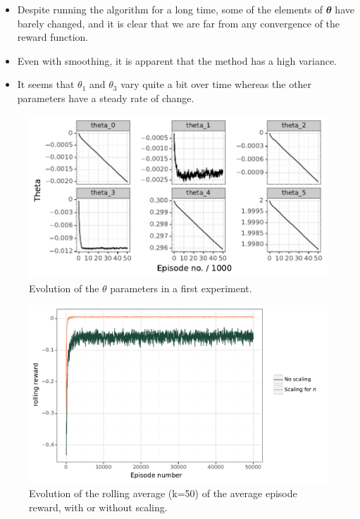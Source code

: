 \documentclass[
  letterpaper,
]{report}
\providecommand{\tightlist}{%
  \setlength{\itemsep}{0pt}\setlength{\parskip}{0pt}}\usepackage{longtable,booktabs,array}
\theoremstyle{plain}
\theoremstyle{definition}
\theoremstyle{definition}
\theoremstyle{remark}
\begin{document}
\begin{itemize}
\tightlist
\item
  Despite running the algorithm for a long time, some of the elements of
  \(\mathbfit{\theta}\) have barely changed, and it is clear that we are
  far from any convergence of the reward function.
\item
  Even with smoothing, it is apparent that the method has a high
  variance.
\item
  It seems that \(\theta_1\) and \(\theta_3\) vary quite a bit over time
  whereas the other parameters have a steady rate of change.
\end{itemize}

\begin{figure}

{\centering \includegraphics{./8_implementation_files/figure-pdf/fig-theta_evolution_exp1-output-1.pdf}

}

\caption{\label{fig-theta_evolution_exp1}Evolution of the \(\theta\)
parameters in a first experiment.}

\end{figure}

\begin{figure}

{\centering \includegraphics{./8_implementation_files/figure-pdf/fig-experimentreward-output-1.pdf}

}

\caption{\label{fig-experimentreward}Evolution of the rolling average
(k=50) of the average episode reward, with or without scaling.}

\end{figure}
\end{document}
